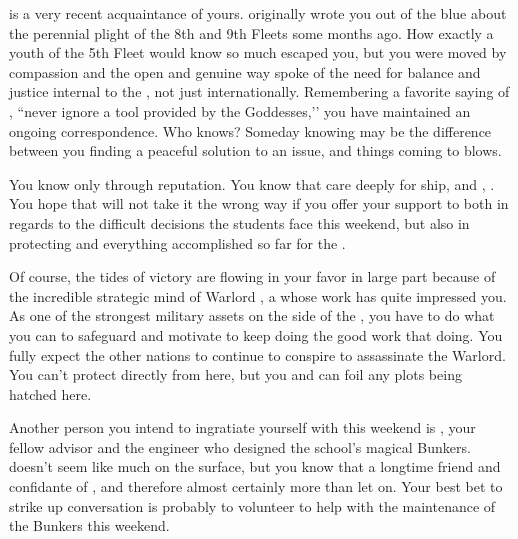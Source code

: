 \documentclass[char]{GL2020}
\begin{document}
\cPirateChild{\full} is a very recent acquaintance of yours. \cPirateChild{\They} originally wrote you out of the blue about the perennial plight of the 8th and 9th Fleets some months ago. How exactly a youth of the 5th Fleet would know so much escaped you, but you were moved by \cPirateChild{\their} compassion and the open and genuine way \cPirateChild{\they} spoke of the need for balance and justice internal to the \pShip{}, not just internationally. Remembering a favorite saying of \cHeadDiplomat{}, ``never ignore a tool provided by the Goddesses,’’ you have maintained an ongoing correspondence. Who knows? Someday knowing \cPirateChild{} may be the difference between you finding a peaceful solution to an issue, and things coming to blows.

You know \cWarlordDaughter{\full} only through reputation. You know that \cWarlordDaughter{\they} care\cWarlordDaughter{\verbs} deeply for \cWarlordDaughter{\their} ship, and \cWarlordDaughter{\their} \cLoud{\parent}, \cLoud{\full}. You hope that \cWarlordDaughter{} will not take it the wrong way if you offer your support to \cWarlordDaughter{\them} both in regards to the difficult decisions the students face this weekend, but also in protecting \cLoud{} and everything \cLoud{\theyhave} accomplished so far for the \pShip{}.

Of course, the tides of victory are flowing in your favor in large part because of the incredible strategic mind of Warlord \cLoud{\full}, a \cLoud{\person} whose work has quite impressed you. As one of the strongest military assets on the side of the \pShip{}, you have to do what you can to safeguard and motivate \cLoud{} to keep doing the good work that \cLoud{\theyare} doing. You fully expect the other nations to continue to conspire to assassinate the Warlord. You can't protect \cLoud{} directly from here, but you and \cWarlordDaughter{} can foil any plots being hatched here.

Another person you intend to ingratiate yourself with this weekend is \cBunker{\full}, your fellow advisor and the engineer who designed the school's magical Bunkers. \cBunker{} doesn't seem like much on the surface, but you know that \cBunker{\theyare} a longtime friend and confidante of \cHeadDiplomat{}, and therefore almost certainly more than \cBunker{\they} let\cBunker{\verbs} on. Your best bet to strike up conversation is probably to volunteer to help \cBunker{} with the maintenance of the Bunkers this weekend.
\end{document}
